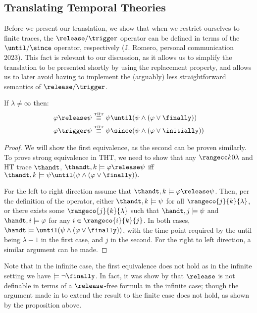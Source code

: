 \subsection{Translating Temporal Theories}

Before we present our translation, we show that when we restrict
ourselves to finite traces, the $\release/\trigger$ operator can be
defined in terms of the $\until/\since$ operator, respectively
(J. Romero, personal communication 2023). This fact is relevant to our
discussion, as it allows us to simplify the translation to be
presented shortly by using the replacement property, and allows us to
later avoid having to implement the (arguably) less straightforward
semantics of $\release/\trigger$.

\begin{proposition}

If $\lambda \neq \infty$ then:
\begin{align*}
\varphi \release \psi &\equivtht \psi \until (\psi \wedge (\varphi \vee \finally)) \\
\varphi \trigger \psi &\equivtht \psi \since (\psi \wedge (\varphi \vee \initially))
\end{align*}
\end{proposition}
\begin{proof}
  We will show the first equivalence, as the second can be proven
  similarly. To prove strong equivalence in THT, we need to show that
  any $\kinlambda$ and HT trace $\thandt$,
  $\thandt,k \models \varphi \release \psi$ iff
  $\thandt,k \models \psi \until (\psi \wedge (\varphi \vee
  \finally)).$

  For the left to right direction assume that
  $\thandt,k \models \varphi \release \psi$. Then, per the definition
  of the operator, either $\thandt,k \models \psi$ for all
  $\rangeco{j}{k}{\lambda}$, or there exists some
  $\rangeco{j}{k}{\lambda}$ such that $\handt,j \models \psi$ and
  $\handt,i \models \varphi$ for any $i \in \rangeco{i}{k}{j}$. In
  both cases,
  $\handt \models \until (\psi \wedge (\varphi \vee \finally))$, with
  the time point required by the until being $\lambda-1$ in the first
  case, and $j$ in the second. For the right to left direction, a
  similar argument can be made.
\end{proof}

Note that in the infinite case, the first equivalence does not hold as
in the infinite setting we have $\models \neg \finally$. In fact, it
was show by \cite{babodife20a} that $\release$ is not definable in
terms of a $\release$-free formula in the infinite case; though the
argument made in \cite[p. 20]{agcadipescscvi20a} to extend the result
to the finite case does not hold, as shown by the proposition above.

